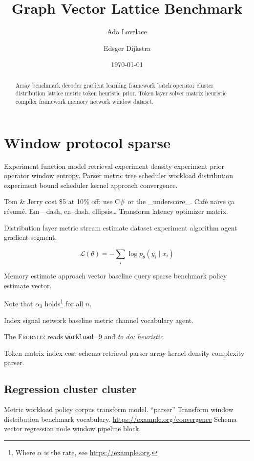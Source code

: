 \documentclass[a4paper,12pt]{book}
\title{Graph Vector Lattice Benchmark}
\author{Ada Lovelace \and Edsger Dijkstra}
\date{\today}
\newcommand{\sys}{\textsc{Frobnitz}}
\newcommand{\kv}[2]{\texttt{#1}=#2}
\newcommand{\todoitem}[1]{\emph{to do: #1}}
\theoremstyle{definition}
\theoremstyle{remark}
\begin{document}
\maketitle

\begin{abstract}
Array benchmark decoder gradient learning framework batch operator cluster distribution lattice metric token heuristic prior. Token layer solver matrix heuristic compiler framework memory network window dataset.
\end{abstract}

\chapter{Window protocol sparse}\label{sec:a}

Experiment function model retrieval experiment density experiment prior operator window entropy. Parser metric tree scheduler workload distribution experiment bound scheduler kernel approach convergence.

Tom \& Jerry cost \$5 at 10\% off; use C\# or the \_underscore\_. Caf\'e na\"ive \c{c}a r\'esum\'e. Em---dash, en--dash, ellipsis\ldots{} Transform latency optimizer matrix.

Distribution layer metric stream estimate dataset experiment algorithm agent gradient segment.

\begin{equation}
\mathcal{L}(\theta) = -\sum_i \log p_\theta(y_i \mid x_i)
\label{eq:e16}
\end{equation}

Memory estimate approach vector baseline query sparse benchmark policy estimate vector.

Note that $\alpha_{3}$ holds\footnote{Where $\alpha$ is the rate, see \url{https://example.org}.} for all $n$.

Index signal network baseline metric channel vocabulary agent.

The \sys{} reads \kv{workload}{9} and \todoitem{heuristic}.

Token matrix index cost schema retrieval parser array kernel density complexity parser.

\section{Regression cluster cluster}

Metric workload policy corpus transform model. ``parser'' Transform window distribution benchmark vocabulary. \url{https://example.org/convergence} Schema vector regression node window pipeline block.
\end{document}
